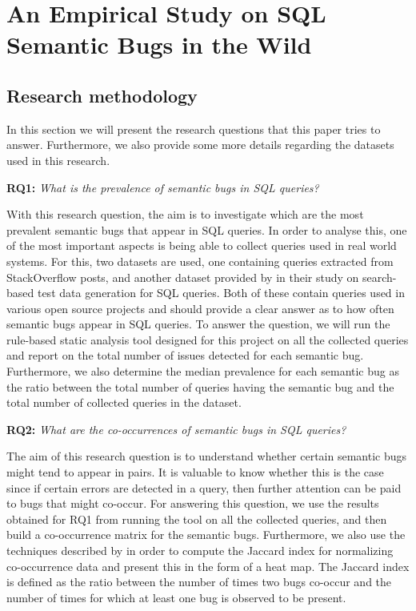 \chapter{An Empirical Study on SQL Semantic Bugs in the Wild}
\label{chapter:semantic_bugs_study}

\section{Research methodology}
\label{section:research_methodology}

In this section we will present the research questions that this paper tries to answer. Furthermore, we also provide some more details regarding the datasets used in this research.

\begin{mdframed}
\noindent \textbf{RQ1:} \emph{What is the prevalence of semantic bugs in SQL queries?}
\end{mdframed}

With this research question, the aim is to investigate which are the most prevalent semantic bugs that appear in SQL queries. In order to analyse this, one of the most important aspects is being able to collect queries used in real world systems. For this, two datasets are used, one containing queries extracted from StackOverflow posts, and another dataset provided by \citet{P011} in their study on search-based test data generation for SQL queries. Both of these contain queries used in various open source projects and should provide a clear answer as to how often semantic bugs appear in SQL queries. To answer the question, we will run the rule-based static analysis tool designed for this project on all the collected queries and report on the total number of issues detected for each semantic bug. Furthermore, we also determine the median prevalence for each semantic bug as the ratio between the total number of queries having the semantic bug and the total number of collected queries in the dataset.

\begin{mdframed}
\noindent \textbf{RQ2:} \emph{What are the co-occurrences of semantic bugs in SQL queries?}
\end{mdframed}

The aim of this research question is to understand whether certain semantic bugs might tend to appear in pairs. It is valuable to know whether this is the case since if certain errors are detected in a query, then further attention can be paid to bugs that might co-occur. For answering this question, we use the results obtained for RQ1 from running the tool on all the collected queries, and then build a co-occurrence matrix for the semantic bugs. Furthermore, we also use the techniques described by \citet{P012} in order to compute the Jaccard index for normalizing co-occurrence data and present this in the form of a heat map. The Jaccard index is defined as the ratio between the number of times two bugs co-occur and the number of times for which at least one bug is observed to be present.

